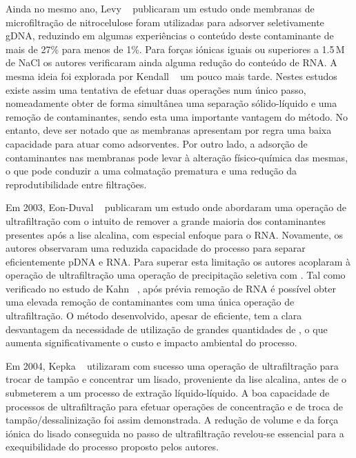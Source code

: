 Ainda no mesmo ano, Levy \et\ \cite{levy00} publicaram um estudo onde  membranas de microfiltração de nitrocelulose foram utilizadas para adsorver seletivamente gDNA, reduzindo em algumas experiências o conteúdo deste contaminante de mais de 27\% para menos de 1\%. Para forças iónicas iguais ou superiores a 1.5\,M de NaCl os autores verificaram ainda alguma redução do conteúdo de RNA. A mesma ideia foi explorada por Kendall \et\ \cite{kendall} um pouco mais tarde. Nestes estudos existe assim uma tentativa de efetuar duas operações num único passo, nomeadamente obter de forma simultânea uma separação sólido-líquido e uma remoção de contaminantes, sendo esta uma importante vantagem do método. No entanto, deve ser notado que as membranas apresentam por regra uma baixa capacidade para atuar como adsorventes. Por outro lado, a adsorção de contaminantes nas membranas pode levar à alteração físico-química das mesmas, o que pode conduzir a uma colmatação prematura e uma redução da reprodutibilidade entre filtrações. 

Em 2003, Eon-Duval \et\ \cite{duvaltff} publicaram um estudo onde abordaram uma operação de ultrafiltração com o intuito de remover a grande maioria dos contaminantes presentes após a lise alcalina, com especial enfoque para o RNA. Novamente, os autores observaram uma reduzida capacidade do processo para separar eficientemente pDNA e RNA. Para superar esta limitação os autores acoplaram à operação de ultrafiltração uma operação de precipitação seletiva com . Tal como verificado no estudo de Kahn \et\ \cite{kahn}, após prévia remoção de RNA é possível obter uma elevada remoção de contaminantes com uma única operação de ultrafiltração. O método desenvolvido, apesar de eficiente, tem a clara desvantagem da necessidade de utilização de grandes quantidades de , o que aumenta significativamente o custo e impacto ambiental do processo.

Em 2004, Kepka \et\ \cite{kepka} utilizaram com sucesso uma operação de ultrafiltração para trocar de tampão e concentrar um lisado, proveniente da lise alcalina, antes de o submeterem a um processo de extração líquido-líquido. A boa capacidade de processos de ultrafiltração para efetuar operações de concentração e de troca de tampão/dessalinização foi assim demonstrada. A redução de volume e da força iónica do lisado conseguida no passo de ultrafiltração revelou-se essencial para a exequibilidade do processo proposto pelos autores.


